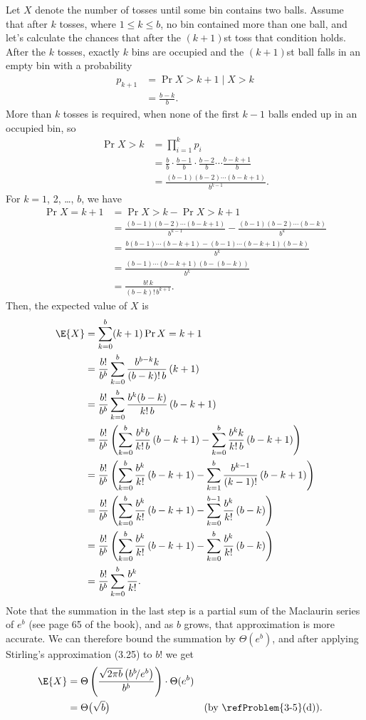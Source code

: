 Let $X$ denote the number of tosses until some bin contains two balls.
Assume that after $k$ tosses, where $1\le k\le b$, no bin contained more than one ball, and let's calculate the chances that after the $(k+1)$st toss that condition holds.
After the $k$ tosses, exactly $k$ bins are occupied and the $(k+1)$st ball falls in an empty bin with a probability
\begin{align*}
    p_{k+1} &= \Pr{X>k+1\mid X>k} \\
    &= \frac{b-k}{b}.
\end{align*}
More than $k$ tosses is required, when none of the first $k-1$ balls ended up in an occupied bin, so
\begin{align*}
    \Pr{X>k} &= \prod_{i=1}^kp_i \\
    &= \frac{b}{b}\cdot\frac{b-1}{b}\cdot\frac{b-2}{b}\cdots\frac{b-k+1}{b} \\[1mm]
    &= \frac{(b-1)(b-2)\cdots(b-k+1)}{b^{k-1}}.
\end{align*}
For $k=1$, 2, \dots, $b$, we have
\begin{align*}
    \Pr{X=k+1} &= \Pr{X>k}-\Pr{X>k+1} \\
    &= \frac{(b-1)(b-2)\cdots(b-k+1)}{b^{k-1}}-\frac{(b-1)(b-2)\cdots(b-k)}{b^k} \\[1mm]
    &= \frac{b(b-1)\cdots(b-k+1)-(b-1)\cdots(b-k+1)(b-k)}{b^k} \\[1mm]
    &= \frac{(b-1)\cdots(b-k+1)(b-(b-k))}{b^k} \\
    &= \frac{b!\,k}{(b-k)!\,b^{k+1}}.
\end{align*}
Then, the expected value of $X$ is
\begin{align*}
    \E{X} &= \sum_{k=0}^b(k+1)\Pr{X=k+1} \\
    &= \frac{b!}{b^b}\sum_{k=0}^b\frac{b^{b-k}k}{(b-k)!\,b}\,(k+1) \\
    &= \frac{b!}{b^b}\sum_{k=0}^b\frac{b^k(b-k)}{k!\,b}\,(b-k+1) \\
    &= \frac{b!}{b^b}\left(\sum_{k=0}^b\frac{b^kb}{k!\,b}\,(b-k+1)-\sum_{k=0}^b\frac{b^kk}{k!\,b}\,(b-k+1)\right) \\
    &= \frac{b!}{b^b}\left(\sum_{k=0}^b\frac{b^k}{k!}\,(b-k+1)-\sum_{k=1}^b\frac{b^{k-1}}{(k-1)!}\,(b-k+1)\right) \\
    &= \frac{b!}{b^b}\left(\sum_{k=0}^b\frac{b^k}{k!}\,(b-k+1)-\sum_{k=0}^{b-1}\frac{b^k}{k!}\,(b-k)\right) \\
    &= \frac{b!}{b^b}\left(\sum_{k=0}^b\frac{b^k}{k!}\,(b-k+1)-\sum_{k=0}^b\frac{b^k}{k!}\,(b-k)\right) \\
    &= \frac{b!}{b^b}\sum_{k=0}^b\frac{b^k}{k!}.
\end{align*}
Note that the summation in the last step is a partial sum of the Maclaurin series of $e^b$ (see page 65 of the book), and as $b$ grows, that approximation is more accurate.
We can therefore bound the summation by $\Theta(e^b)$, and after applying Stirling's approximation (3.25) to $b!$ we get
\begin{align*}
    \E{X} &= \Theta\left(\frac{\sqrt{2\pi b}\,\bigl(b^b\!/e^b\bigr)}{b^b}\right)\cdot\Theta(e^b) \\
    &= \Theta\bigl(\sqrt{b}\bigr) && \text{(by \refProblem{3-5}(d))}.
\end{align*}
